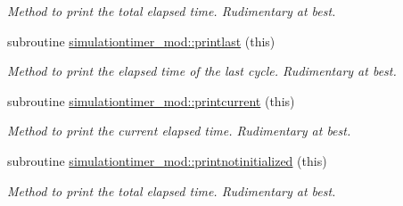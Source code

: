 \begin{DoxyCompactItemize}
\begin{DoxyCompactList}\small\item\em Method to print the total elapsed time. Rudimentary at best. \end{DoxyCompactList}\item 
subroutine \mbox{\hyperlink{namespacesimulationtimer__mod_ae6e0d8f98a24587daf93cedb4e93ad79}{simulationtimer\+\_\+mod\+::printlast}} (this)
\begin{DoxyCompactList}\small\item\em Method to print the elapsed time of the last cycle. Rudimentary at best. \end{DoxyCompactList}\item 
subroutine \mbox{\hyperlink{namespacesimulationtimer__mod_abf4d4c3f383597e975e7c9d12dab6f13}{simulationtimer\+\_\+mod\+::printcurrent}} (this)
\begin{DoxyCompactList}\small\item\em Method to print the current elapsed time. Rudimentary at best. \end{DoxyCompactList}\item 
subroutine \mbox{\hyperlink{namespacesimulationtimer__mod_a1c7581b4e12efde67021c8d94e0ef696}{simulationtimer\+\_\+mod\+::printnotinitialized}} (this)
\begin{DoxyCompactList}\small\item\em Method to print the total elapsed time. Rudimentary at best. \end{DoxyCompactList}\end{DoxyCompactItemize}
